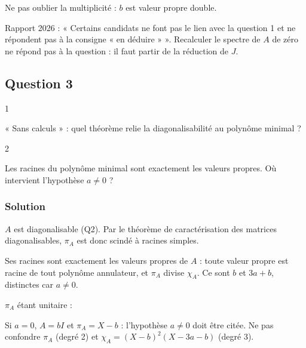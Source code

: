 \documentclass[11pt,a4paper]{article}
\newcommand{\equationajustee}[1]{%
  \sbox{\boiteequation}{$\displaystyle #1$}%
  \ifdim\wd\boiteequation>\linewidth
    \[\resizebox{\linewidth}{!}{\usebox{\boiteequation}}\]%
  \else
    \[#1\]%
  \fi}
\begin{document}
\begin{piege}

Ne pas oublier la multiplicité : \(b\) est valeur propre double.

\end{piege}

\begin{jury}

Rapport 2026 : « Certains candidats ne font pas le lien avec la question 1 et ne répondent pas à la consigne « en déduire » ». Recalculer le spectre de \(A\) de zéro ne répond pas à la question : il faut partir de la réduction de \(J\).

\end{jury}

\hypertarget{question-3}{%
\subsection{Question 3}\label{question-3}}

\begin{indication}{1}

« Sans calculs » : quel théorème relie la diagonalisabilité au polynôme minimal ?

\end{indication}

\begin{indication}{2}

Les racines du polynôme minimal sont exactement les valeurs propres. Où intervient l'hypothèse \(a\neq0\) ?

\end{indication}

\hypertarget{solution-2}{%
\subsubsection{Solution}\label{solution-2}}

\(A\) est diagonalisable (Q2). Par le théorème de caractérisation des matrices diagonalisables, \(\pi_A\) est donc scindé à racines simples.

Ses racines sont exactement les valeurs propres de \(A\) : toute valeur propre est racine de tout polynôme annulateur, et \(\pi_A\) divise \(\chi_A\). Ce sont \(b\) et \(3a+b\), distinctes car \(a\neq0\).

\(\pi_A\) étant unitaire :
\equationajustee{\boxed{\pi_A=(X-b)(X-3a-b)}}

\begin{piege}

Si \(a=0\), \(A=bI\) et \(\pi_A=X-b\) : l'hypothèse \(a\neq0\) doit être citée. Ne pas confondre \(\pi_A\) (degré 2) et \(\chi_A=(X-b)^2(X-3a-b)\) (degré 3).

\end{piege}
\end{document}
